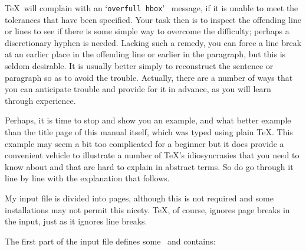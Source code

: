 \TeX\ will complain with an `{\tt overfull hbox}' \ message, if it is
unable to meet the tolerances that have been specified.
Your task then is to inspect the offending line or lines to see if there
is some simple way to overcome the difficulty; perhaps a discretionary
hyphen is needed.  Lacking such a remedy, you can force a line break at an
earlier place in the offending line or earlier in the paragraph,
but this is seldom desirable. It is usually better
simply to reconstruct the sentence or paragraph so as to avoid the
trouble. Actually, there are a number of ways that you can anticipate
trouble and provide for it in advance, as you will learn through
experience.


Perhaps, it is time to stop and show you an example, and what better
example than the title page of this  manual itself, which was typed using plain \TeX.
This example may seem a bit too complicated for a beginner but it does
provide a convenient vehicle to illustrate a number of \TeX's
idiosyncrasies that you need to know about and that are hard to explain in
abstract terms. So do go through it line by line with the explanation that
follows.

My input file is divided into pages, although
this is not required and some installations may not permit this nicety.
\TeX, of course, ignores page breaks in the input, just as it ignores line breaks.

The first part of the input file defines some \css\/\ and contains: \medskip
\vbox{}

